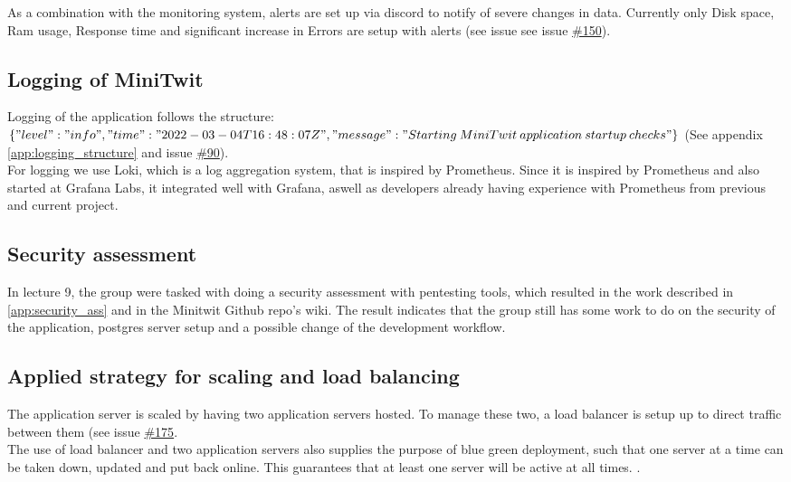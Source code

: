 As a combination with the monitoring system, alerts are set up via discord to notify of severe changes in data. Currently only Disk space, Ram usage, Response time and significant increase in Errors are setup with alerts (see issue see issue \href{https://github.com/DevelOpsITU/MiniTwit/issues/150}{\#150}).


\subsection{Logging of MiniTwit}
Logging of the application follows the structure: \\
$\{"level":"info","time":"2022-03-04T16:48:07Z",\\"message":"Starting\: MiniTwit\: application\: startup\: checks"\}$ (See appendix \ref{app:logging_structure} and issue \href{https://github.com/DevelOpsITU/MiniTwit/issues/90}{\#90}).\\

For logging we use Loki, which is a log aggregation system, that is inspired by Prometheus\cite{grafana_loki}\cite{grafana_loki_docs}. Since it is inspired by Prometheus and also started at Grafana Labs, it integrated well with Grafana, aswell as developers already having experience with Prometheus from previous and current project. 

\subsection{Security assessment}
In lecture 9, the group were tasked with doing a security assessment with pentesting tools, which resulted in the work described in \autoref{app:security_ass} and in the Minitwit Github repo's wiki.\cite{github_wiki_security} The result indicates that the group still has some work to do on the security of the application, postgres server setup and a possible change of the development workflow. 


\subsection{Applied strategy for scaling and load balancing}
The application server is scaled by having two application servers hosted. To manage these two, a load balancer is setup up to direct traffic between them (see issue \href{https://github.com/DevelOpsITU/MiniTwit/issues/175}{\#175}. \\
The use of load balancer and two application servers also supplies the purpose of blue green deployment, such that one server at a time can be taken down, updated and put back online. This guarantees that at least one server will be active at all times.  \cite{blue_green_deployment}.

